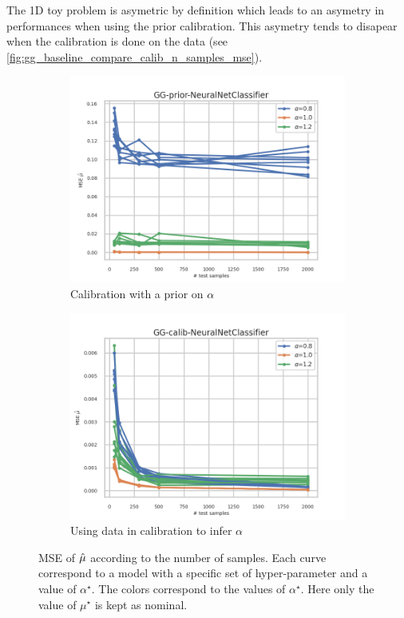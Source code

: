 The 1D toy problem is asymetric by definition which leads to an asymetry in performances when using the prior calibration.
This asymetry tends to disapear when the calibration is done on the data (see \autoref{fig:gg_baseline_compare_calib_n_samples_mse}).


\begin{figure}[ht!]
  \centering
  \begin{subfigure}[t]{0.49\linewidth}
    \includegraphics[width=\linewidth]{COMPARE/GG-prior/NeuralNetClassifier/profusion_n_samples_mse.png}
    \caption{Calibration with a prior on $\alpha$}
  \end{subfigure}%
  \hfill
  \begin{subfigure}[t]{0.49\linewidth}
    \includegraphics[width=\linewidth]{COMPARE/GG-calib/NeuralNetClassifier/profusion_n_samples_mse.png}
    \caption{Using data in calibration to infer $\alpha$}
  \end{subfigure}
  \caption{MSE of $\hat\mu$ according to the number of samples. Each curve correspond to a model with a specific set of hyper-parameter and a value of $\alpha^\star$. The colors correspond to the values of $\alpha^\star$. Here only the value of $\mu^\star$ is kept as nominal.}
  \label{fig:gg_baseline_compare_calib_n_samples_mse}
\end{figure}
